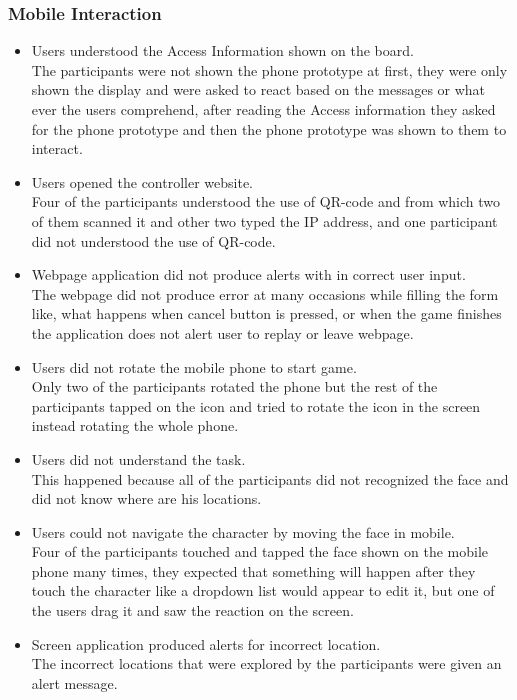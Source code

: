 \subsubsection {Mobile Interaction}
\begin{itemize}
\item Users understood the Access Information shown on the board. \\ 
The participants were not shown the phone prototype at first, they were only shown the display and were asked to react based on the messages or what ever the users comprehend, after reading the Access information they asked for the phone prototype and then the phone prototype was shown to them to interact.

\item Users opened the controller website. \\ 
Four of the participants understood the use of QR-code and from which two of them scanned it and other two typed the IP address, and one participant did not understood the use of QR-code.

\item Webpage application did not produce alerts with in correct user input.\\ 
The webpage did not produce error at many occasions while filling the form like, what happens when cancel button is pressed, or when the game finishes the application does not alert user to replay or leave webpage.

\item Users did not rotate the mobile phone to start game.\\ 
Only two of the participants rotated the phone but the rest of the participants tapped on the icon and tried to rotate the icon in the screen instead rotating the whole phone.

\item Users did not understand the task.\\ 
This happened because all of the participants did not recognized the face and did not know where are his locations.

\item Users could not navigate the character by moving the face in mobile.\\ 
Four of the participants touched and tapped the face shown on the mobile phone many times, they expected that something will happen after they touch the character like a dropdown list would appear to edit it, but one of the users drag it and saw the reaction on the screen.

\item Screen application produced alerts for incorrect location.\\ 
The incorrect locations that were explored by the participants were given an alert message.
\end{itemize}

